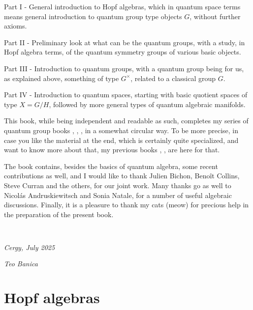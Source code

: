 \documentclass[12pt]{amsbook}
\begin{document}
\bigskip

Part I - General introduction to Hopf algebras, which in quantum space terms means general introduction to quantum group type objects $G$, without further axioms.

\bigskip

Part II - Preliminary look at what can be the quantum groups, with a study, in Hopf algebra terms, of the quantum symmetry groups of various basic objects.

\bigskip

Part III - Introduction to quantum groups, with a quantum group being for us, as explained above, something of type $G^\times$, related to a classical group $G$. 

\bigskip

Part IV - Introduction to quantum spaces, starting with basic quotient spaces of type $X=G/H$, followed by more general types of quantum algebraic manifolds. 

\bigskip

This book, while being independent and readable as such, completes my series of quantum group books \cite{ba1}, \cite{ba2}, \cite{ba3}, in a somewhat circular way. To be more precise, in case you like the material at the end, which is certainly quite specialized, and want to know more about that, my previous books \cite{ba1}, \cite{ba2}, \cite{ba3} are here for that.

\bigskip

The book contains, besides the basics of quantum algebra, some recent contributions as well, and I would like to thank Julien Bichon, Beno\^ it Collins, Steve Curran and the others, for our joint work. Many thanks go as well to Nicol\'as Andruskiewitsch and Sonia Natale, for a number of useful algebraic discussions. Finally, it is a pleasure to thank my cats (meow) for precious help in the preparation of the present book.

\bigskip

\

{\em Cergy, July 2025}

\smallskip

{\em Teo Banica}

\baselineskip=15.95pt
\tableofcontents
\baselineskip=14pt

\part{Hopf algebras}

\ \vskip50mm
\end{document}
